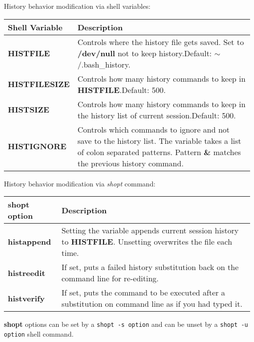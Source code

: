\documentclass{article}
\begin{document}
\vspace{0.4in}

History behavior modification via shell variables:

\begin{tabular}{|p{3.5cm}|p{14cm}|}
\hline
\large\textbf{Shell Variable} & \large\textbf{Description} \\
\hline
\textbf{HISTFILE} & Controls where the history file gets saved. Set to \textbf{/dev/null} not to keep history.\newline Default: $\sim$/.bash\_history. \\
\hline
\textbf{HISTFILESIZE} & Controls how many history commands to keep in \textbf{HISTFILE}.\newline Default: 500. \\
\hline
\textbf{HISTSIZE} & Controls how many history commands to keep in the history list of current session.\newline Default: 500. \\
\hline
\textbf{HISTIGNORE} & Controls which commands to ignore and not save to the history list. The variable takes a list of colon separated patterns. Pattern \textbf{\&} matches the previous history command. \\
\hline
\end{tabular}

\vspace{0.4in}

History behavior modification via \textit{shopt} command:

\begin{tabular}{|p{3.5cm}|p{14cm}|}
\hline
\large\textbf{shopt option} & \large\textbf{Description} \\
\hline
\textbf{histappend} & Setting the variable appends current session history to \textbf{HISTFILE}. Unsetting overwrites the file each time. \\
\hline
\textbf{histreedit} & If set, puts a failed history substitution back on the command line for re-editing. \\
\hline
\textbf{histverify} & If set, puts the command to be executed after a substitution on command line as if you had typed it. \\
\hline
\end{tabular}

\vspace{0.2in}

\textbf{shopt} options can be set by a \texttt{shopt -s option} and can be unset by a \texttt{shopt -u option} shell command.
\end{document}
